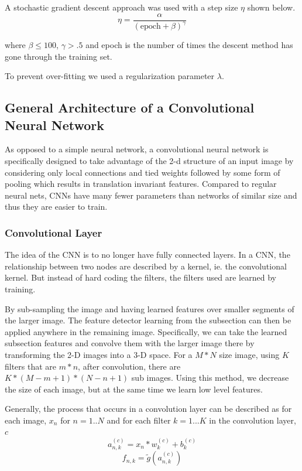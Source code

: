 \documentclass[12pt, twocolumn]{article}
\begin{document}
A stochastic gradient descent approach was used with a step size $\eta$ shown below.
\begin{equation}
\eta = \frac{ \alpha}{ (\textrm{epoch} + \beta)^\gamma}
\end{equation}

where $\beta \leq 100$, $\gamma >.5$ and epoch is the number of times the descent method has gone through the training set.  
\newline\newline

To prevent over-fitting we used a regularization parameter $\lambda$. 


\subsection{General Architecture of a Convolutional Neural Network}
As opposed to a simple neural network, a convolutional neural network is specifically designed to take advantage of the 2-d structure of an input image by considering only local connections and tied weights followed by some form of pooling which results in translation invariant features. Compared to regular neural nets,  CNNs  have many fewer parameters than networks of similar size and thus they are easier to train. 



\subsubsection{Convolutional Layer}
The idea of the CNN is to no longer have fully connected layers. In a CNN, the relationship between two nodes are described by a kernel, ie. the convolutional kernel. But instead of hard coding the filters, the filters used are learned by training. 

By sub-sampling the image and having learned features over smaller segments of the larger image. The feature detector learning from the subsection can then be applied anywhere in the remaining image. Specifically, we can take the learned subsection features and convolve them with the larger image there by transforming the 2-D images into a 3-D space. For a  $M * N $ size image, using $K$ filters that are $m * n$,  after convolution, there are  $ K * (M - m + 1) * (N - n + 1) $ sub images. Using this method, we decrease the size of each image, but at the same time we learn low level features. 


Generally, the process that occurs in a convolution layer can be described as for each image, $x_n$ for $n=1..N$ and for each filter $k=1...K$ in the convolution layer, $c$
\begin{equation}
a_{n,k}^{(c)}= x_n \ast w_k^{(c)} + b_k^{(c)}
\end{equation}
\begin{equation}
f_{n,k}= \tilde{g}(a_{n,k}^{(c)})
\end{equation}
 
\end{document}
